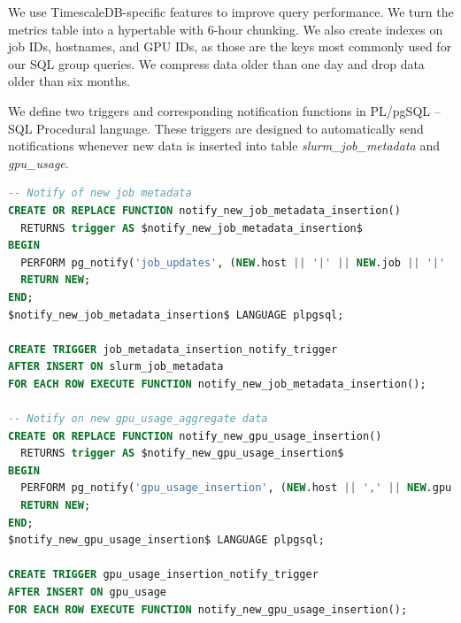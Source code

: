 We use TimescaleDB-specific features to improve query performance. We turn the metrics table into a hypertable with 6-hour chunking. We also create indexes on job IDs, hostnames, and GPU IDs, as those are the keys most commonly used for our SQL group queries. We compress data older than one day and drop data older than six months.

We define two triggers and corresponding notification functions in PL/pgSQL -- SQL Procedural language. These triggers are designed to automatically send notifications whenever new data is inserted into table \textit{slurm\_job\_metadata} and \textit{gpu\_usage}.

\begin{lstlisting}[language=SQL]
-- Notify of new job metadata
CREATE OR REPLACE FUNCTION notify_new_job_metadata_insertion()
  RETURNS trigger AS $notify_new_job_metadata_insertion$
BEGIN
  PERFORM pg_notify('job_updates', (NEW.host || '|' || NEW.job || '|' || NEW.type || '|' || NEW.metadata)::text);
  RETURN NEW;
END;
$notify_new_job_metadata_insertion$ LANGUAGE plpgsql;

CREATE TRIGGER job_metadata_insertion_notify_trigger
AFTER INSERT ON slurm_job_metadata
FOR EACH ROW EXECUTE FUNCTION notify_new_job_metadata_insertion();

-- Notify on new gpu_usage_aggregate data
CREATE OR REPLACE FUNCTION notify_new_gpu_usage_insertion()
  RETURNS trigger AS $notify_new_gpu_usage_insertion$
BEGIN
  PERFORM pg_notify('gpu_usage_insertion', (NEW.host || ',' || NEW.gpu || ',' || NEW.job || ',' || NEW.load_gpu || ',' || NEW.load_memory || ',' || NEW.used_mem || ',' || NEW.power || ',' || NEW.temperature)::text);
  RETURN NEW;
END;
$notify_new_gpu_usage_insertion$ LANGUAGE plpgsql;

CREATE TRIGGER gpu_usage_insertion_notify_trigger
AFTER INSERT ON gpu_usage
FOR EACH ROW EXECUTE FUNCTION notify_new_gpu_usage_insertion();
\end{lstlisting}


